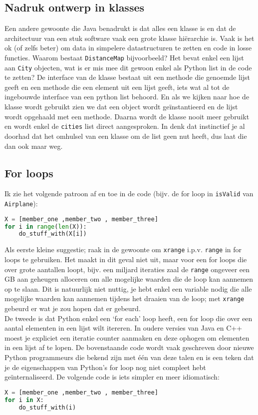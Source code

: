 \documentclass[a4paper]{article}
\begin{document}
\subsection{Nadruk ontwerp in klasses}
Een andere gewoonte die Java benadrukt is dat alles een klasse is en dat de architectuur van een stuk software vaak een grote klasse hi\"erarchie is. Vaak is het ok (of zelfs beter) om data in simpelere datastructuren te zetten en code in losse functies. Waarom bestaat \verb!DistanceMap! bijvoorbeeld? Het bevat enkel een lijst aan \verb!City! objecten, wat is er mis mee dit gewoon enkel als Python list in de code te zetten? De interface van de klasse bestaat uit een methode die genoemde lijst geeft en een methode die een element uit een lijst geeft, iets wat al tot de ingebouwde interface van een python list behoord. En als we kijken naar hoe de klasse wordt gebruikt zien we dat een object wordt ge\"instantieerd en de lijst wordt opgehaald met een methode. Daarna wordt de klasse nooit meer gebruikt en wordt enkel de \verb!cities! list direct aangesproken. In denk dat instinctief je al doorhad dat het omhulsel van een klasse om de list geen nut heeft, dus laat die dan ook maar weg.
\subsection{For loops}
Ik zie het volgende patroon af en toe in de code (bijv. de for loop in \verb!isValid! van \verb!Airplane!):
\begin{lstlisting}[language=Python] 
X = [member_one ,member_two , member_three] 
for i in range(len(X)):
    do_stuff_with(X[i])
\end{lstlisting}
Als eerste kleine suggestie; raak in de gewoonte om \verb!xrange! i.p.v. \verb!range! in for loops te gebruiken. Het maakt in dit geval niet uit, maar voor een for loops die over grote aantallen loopt, bijv. een miljard iteraties zaal de \verb!range! ongeveer een GB aan geheugen alloceren om alle mogelijke waarden die de loop kan aannemen op te slaan. Dit is natuurlijk niet nuttig, je hebt enkel een variable nodig die alle mogelijke waarden kan aannemen tijdens het draaien van de loop; met \verb!xrange! gebeurd er wat je zou hopen dat er gebeurd. \\
De tweede is dat Python enkel een `for each' loop heeft, een for loop die over een aantal elementen in een lijst wilt itereren. In oudere versies van Java en C++ moest je expliciet een iteratie counter aanmaken en deze ophogen om elementen in een lijst af te lopen. De bovenstaande code wordt vaak geschreven door nieuwe Python programmeurs die bekend zijn met \'e\'en van deze talen en is een teken dat je de eigenschappen van Python's for loop nog niet compleet hebt ge\"internaliseerd.  De volgende code is iets simpler en meer idiomatisch:
\begin{lstlisting}[language=Python] 
X = [member_one ,member_two , member_three] 
for i in X:
    do_stuff_with(i)
\end{lstlisting}
\end{document}
